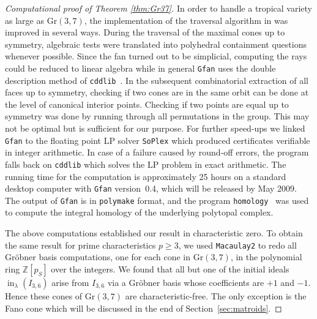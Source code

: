 \documentclass[12pt,a4paper]{amsart}
\theoremstyle{definition}
\newcommand{\Z}{{\mathbb{Z}}}
\newcommand{\Gr}{{\mathrm{Gr}}}
\providecommand\cddlib{\texttt{cddlib}\xspace}
\providecommand\SoPlex{\texttt{SoPlex}\xspace}
\providecommand\Macaulay{\texttt{Macaulay2}\xspace}
\providecommand\Gfan{\texttt{Gfan}\xspace}
\providecommand\polymake{\texttt{polymake}\xspace}
\providecommand\homology{\texttt{homology}\xspace}
\DeclareMathOperator{\initial}{in}
\begin{document}
\begin{proof}[Computational proof of Theorem \ref{thm:Gr37}]
  In order to handle a tropical variety as large as $\Gr(3,7)$, the
  implementation of the traversal algorithm in \cite{BJSST} was improved in
  several ways.  During the traversal of the maximal cones up to symmetry,
  algebraic tests were translated into polyhedral containment questions
  whenever possible. Since the fan turned out to be simplicial, computing the
  rays could be reduced to linear algebra while in general \Gfan uses the
  double description method of \cddlib~\cite{Cddlib}. In the subsequent
  combinatorial extraction of all faces up to symmetry, checking if two cones
  are in the same orbit can be done at the level of canonical interior points.
  Checking if two points are equal up to symmetry was done by running through
  all permutations in the group.  This may not be optimal but is sufficient
  for our purpose. For further speed-ups we linked \Gfan to the floating point
  LP solver \SoPlex \cite{Soplex} which produced certificates verifiable in
  integer arithmetic. In case of a failure caused by round-off errors, the
  program falls back on \cddlib which solves the LP problem in exact
  arithmetic. The running time for the computation is approximately 25 hours
  on a standard desktop computer with \Gfan version~0.4, which will be
  released by May 2009.  The output of \Gfan is in \polymake \cite{polymake}
  format, and the program \homology~\cite{homology} was used to compute the
  integral homology of the underlying polytopal complex.

  The above computations established our result in characteristic
  zero.  To obtain the same result for prime characteristics $p \geq
  3$, we used \Macaulay to redo all Gr\"obner basis
  computations, one for each cone in $\Gr(3,7)$, in the polynomial
  ring $\Z[p_S]$ over the integers. We found that all but one of the
  initial ideals $\initial_\lambda(I_{3,6})$ arise from $I_{3,6}$ via
  a Gr\"obner basis whose coefficients are $+1$ and $-1$. Hence
  these cones of $\Gr(3,7)$ are characteristic-free. The only
  exception is the Fano cone which will be discussed in the
  end of Section~\ref{sec:matroids}.
\end{proof}
\end{document}
